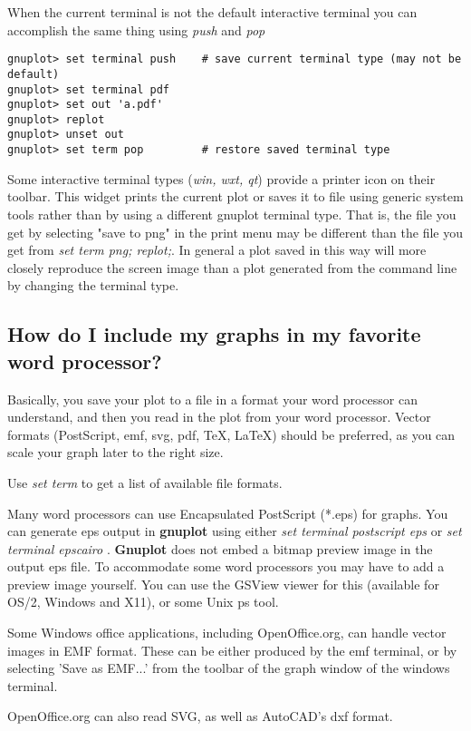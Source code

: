 \documentclass[a4paper,11pt]{article}
\newcommand{\gnuplot}{\textbf{gnuplot }}
\newcommand{\Gnuplot}{\textbf{Gnuplot }}
\begin{document}
When the current terminal is not the default interactive terminal you
can accomplish the same thing using {\em push} and {\em pop}
\small
\begin{verbatim}
gnuplot> set terminal push    # save current terminal type (may not be default)
gnuplot> set terminal pdf
gnuplot> set out 'a.pdf'
gnuplot> replot
gnuplot> unset out
gnuplot> set term pop         # restore saved terminal type
\end{verbatim}
\normalsize

Some interactive terminal types (\textit{win, wxt, qt}) provide a printer icon
on their toolbar. This widget prints the current plot or saves it to file
using generic system tools rather than by using a different gnuplot terminal type.
That is, the file you get by selecting "save to png" in the print menu may be
different than the file you get from \textit{set term png; replot;}.
In general a plot saved in this way will more closely reproduce the screen image than
a plot generated from the command line by changing the terminal type.


\subsection{How do I include my graphs in my favorite word processor?}

Basically, you save your plot to a file in a format your word processor
can understand, and then you read in the plot from your word processor. Vector
formats (PostScript, emf, svg, pdf, \TeX{}, \LaTeX{}) should be preferred,
as you can scale your graph later to the right size.

Use {\em set term} to get a list of available file formats.

Many word processors can use Encapsulated PostScript (*.eps) for graphs.
You can generate eps output in \gnuplot using either
{\em set terminal postscript eps}
or
{\em set terminal epscairo}
.
\Gnuplot does not embed a bitmap preview image in the output eps file.
To accommodate some word processors you may have to add a preview image yourself.
You can use the GSView viewer for this (available for OS/2, Windows and X11),
or some Unix ps tool.

Some Windows office applications, including OpenOffice.org, can handle
vector images in EMF format. These can be either produced by the emf
terminal, or by selecting 'Save as EMF...' from the toolbar of the graph
window of the windows terminal.

OpenOffice.org can also read SVG, as well as AutoCAD's dxf format.
\end{document}
